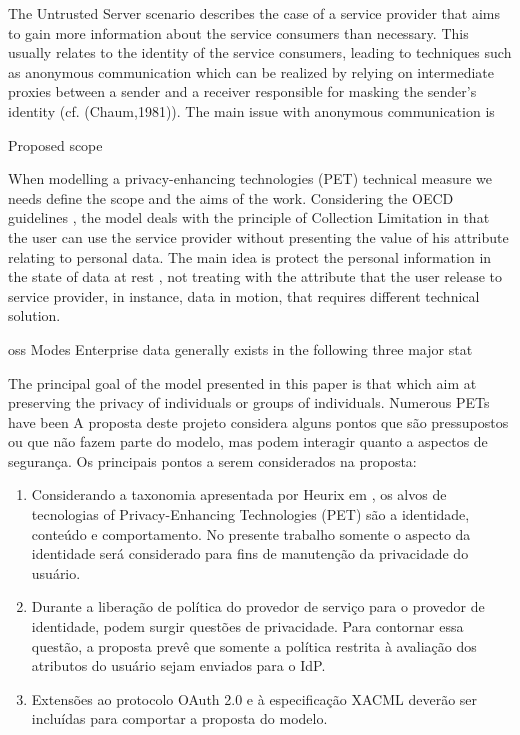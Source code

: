 \documentclass{doublecol-new}
\begin{document}
The Untrusted Server scenario describes the case of a service provider that aims to gain more information about the service
consumers than necessary. This usually relates to the identity of the service consumers, leading to techniques such as
anonymous communication which can be realized by relying on intermediate proxies between a sender and a receiver
responsible for masking the sender's identity (cf. (Chaum,1981)). The main issue with anonymous communication is

Proposed scope

When modelling a privacy-enhancing technologies (PET) technical measure we needs define the scope and the aims of the work. Considering the OECD guidelines \citep{oecd2013guidelinesupdated}, the model deals with the principle of Collection Limitation in that the user can use the service provider without presenting the value of his attribute relating to personal data. The main idea is protect the personal information in the state of data at rest \citep{liu2010data}, not treating with the attribute that the user release to service provider, in instance, data in motion, that requires different technical solution. 

oss Modes
Enterprise data generally exists in 
the following three major stat

The principal goal of the model presented in this paper is that which aim
at preserving the privacy of individuals or groups of individuals. Numerous PETs have been
A proposta deste projeto considera alguns pontos que são pressupostos ou que não fazem parte do modelo, mas podem interagir quanto a aspectos de segurança. Os principais pontos a serem considerados na proposta:
\begin{enumerate}
	\item Considerando a taxonomia apresentada por Heurix em \cite{heurix2015taxonomy}, os alvos de tecnologias of Privacy-Enhancing Technologies (PET) são a identidade, conteúdo e comportamento. No presente trabalho somente o aspecto da identidade será considerado para fins de manutenção da privacidade do usuário.
	\item Durante a liberação de política do provedor de serviço para o provedor de identidade, podem surgir questões de privacidade. Para contornar essa questão, a proposta prevê que somente a política restrita à avaliação dos atributos do usuário sejam enviados para o IdP.
	\item Extensões ao protocolo OAuth 2.0 e à especificação XACML deverão ser incluídas para comportar a proposta do modelo.
\end{enumerate}
\end{document}
